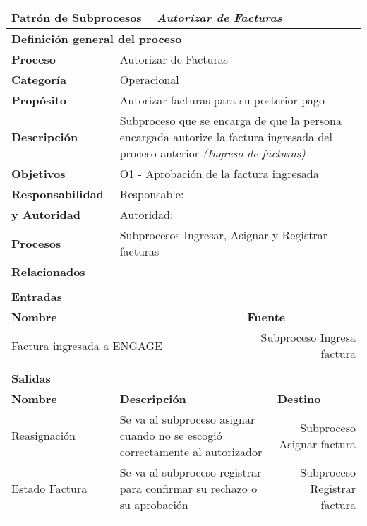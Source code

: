 \begin{longtable}{|llrrrrrr|}
	\hline
	\multicolumn{2}{|l|}{\textbf{Patrón de Subprocesos}} & \multicolumn{6}{|l|}{\textit{Autorizar de Facturas}} \\ \hline
	\multicolumn{8}{|l|}{\textbf{Definición general del proceso}} \\ \hline
	\textbf{Proceso} & \multicolumn{7}{|m{12cm}|}{Autorizar de Facturas} \\ \hline
	\textbf{Categoría} & \multicolumn{7}{|m{12cm}|}{Operacional} \\ \hline
	\textbf{Propósito} & \multicolumn{7}{|m{12cm}|}{Autorizar facturas para su posterior pago} \\ \hline
    \textbf{Descripción} & \multicolumn{7}{|m{12cm}|}{Subproceso que se encarga de que la persona encargada autorize la factura ingresada del proceso anterior \textit{(Ingreso de facturas)}} \\ \hline
	\multirow{0}[6]{*}{\textbf{Objetivos}} 
          & \multicolumn{7}{|l|}{O1 -  Aprobación de la factura ingresada} \\ \hline
    \multicolumn{1}{|l|}{\textbf{Responsabilidad}} 	& \multicolumn{7}{|l|}{Responsable: } \\
	\multicolumn{1}{|l|}{\textbf{y Autoridad}} 	& \multicolumn{7}{|l|}{Autoridad: } \\ \hline
    \multicolumn{1}{|l|}{\textbf{Procesos}} 	& \multicolumn{7}{|m{12cm}|}{Subprocesos Ingresar, Asignar y Registrar facturas} \\
	\multicolumn{1}{|l|}{\textbf{Relacionados}} 	&  \multicolumn{7}{|m{12cm}|}{} \\ \hline
          &       &       &       &       &       &       &  \\ \hline
    \multicolumn{8}{|l|}{\textbf{Entradas}} \\ \hline
    \multicolumn{5}{|l|}{\textbf{Nombre}}   & \multicolumn{3}{|l|}{\textbf{Fuente}} \\ \hline
    \multicolumn{5}{|l|}{Factura ingresada a ENGAGE} & \multicolumn{3}{|m{3.5cm}|}{Subproceso Ingresa factura} \\  \hline
       &       &       &       &       &       &       &  \\ \hline
    \multicolumn{8}{|l|}{\textbf{Salidas}} \\ \hline
    \textbf{Nombre} & \multicolumn{5}{|l|}{\textbf{Descripción}} & \multicolumn{2}{|l|}{\textbf{Destino}} \\ \hline
    Reasignación & \multicolumn{5}{|m{6cm}|}{Se va al subproceso asignar cuando no se escogió correctamente al autorizador} & \multicolumn{2}{|m{3cm}|}{Subproceso Asignar factura} \\ \hline
    Estado Factura & \multicolumn{5}{|m{6cm}|}{Se va al subproceso registrar para confirmar su rechazo o su aprobación} & \multicolumn{2}{|m{3cm}|}{Subproceso Registrar factura} \\ \hline
       &       &       &       &       &       &       &  \\ \hline
	

\end{longtable}

